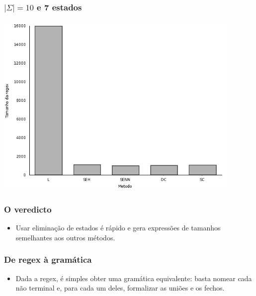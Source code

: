 \documentclass{beamer}
\begin{document}
\begin{frame}[fragile]
  \frametitle{$|\Sigma| = 10$ e 7 estados}
  \begin{center}
  \includegraphics[width=0.9\textwidth]{plot10_7.png}
  \end{center}
\end{frame}

\begin{frame}[fragile]
  \frametitle{O veredicto}
  \begin{itemize}
  \item Usar elimina\c c\~ao de estados \'e r\'apido e gera
    express\~oes de tamanhos semelhantes aos outros m\'etodos.
  \end{itemize}
\end{frame}

\begin{frame}[fragile]
  \frametitle{De regex \`a gram\'atica}
  \begin{itemize}
  \item Dada a regex, \'e simples obter uma gram\'atica equivalente:
    basta nomear cada n\~ao terminal e, para cada um deles, formalizar
    as uni\~oes e os fechos.
  \end{itemize}
\end{frame}
\end{document}
